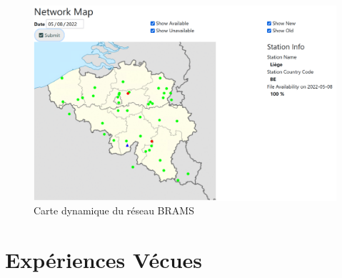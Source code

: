 \documentclass[11pt]{article}
\begin{document}
\begin{figure}[t]
    \begin{center}
        \includegraphics[scale=0.25]{map.png}
        \caption{Carte dynamique du réseau BRAMS}
    \end{center}
\end{figure}

\newpage

\section{Expériences Vécues}
\end{document}
